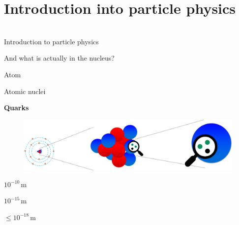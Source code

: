 \section{Introduction into particle physics}
\begin{frame}[plain]
   \begin{center} 
  \huge{   }\\
   \Large{Introduction to particle physics}
\end{center}
\end{frame}
\begin{frame}[t]{And what is actually in the nucleus?}

    \begin{minipage}{\linewidth}
        \begin{minipage}{0.33\linewidth}
             \qquad Atom 
        \end{minipage}     
        \begin{minipage}{0.4\linewidth}
             \quad Atomic nuclei 
        \end{minipage}    
        \begin{minipage}{0.24\linewidth}
            \quad\textbf{Quarks}
        \end{minipage}    
    \end{minipage} \vspace{0.5cm}
    
     \begin{minipage}{0.99\linewidth}
        \begin{figure}
            \centering
            \includegraphics[width=\textwidth]{Figures Introductory Lecture/Standard Model/Scale_Atom_Quark_noText_2.png}
            \label{fig:scale_atom_qaurk}
        \end{figure}
     \end{minipage}  
     \vspace{-15cm}
    \begin{minipage}{\linewidth}
        \begin{minipage}{0.33\linewidth}
            \qquad \Large $10^{-10}$\,m
        \end{minipage}     
        \begin{minipage}{0.33\linewidth}
             \quad \Large $10^{-15}$\,m
        \end{minipage}    
        \begin{minipage}{0.29\linewidth}
            \quad \Large $\leq10^{-18}$\,m
        \end{minipage}    
    \end{minipage}

\end{frame}
